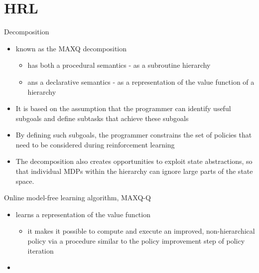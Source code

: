 
\section{HRL}

\begin{frame}{Decomposition}
\begin{itemize}
    \item known as the MAXQ decomposition
    \begin{itemize}
        \item has both a procedural semantics -  as a subroutine hierarchy
        \item ans a declarative semantics - as a representation of the value function of a hierarchy
    \end{itemize}
    \item It is based on the assumption that the programmer can identify useful subgoals and define subtasks that achieve these subgoals
    \item By defining such subgoals, the programmer \alert{constrains the set of policies} that need to be considered during reinforcement learning
    \item {\color{red}The decomposition also creates opportunities to exploit state abstractions, so that individual MDPs within the hierarchy can ignore large parts of the state space.}
    \end{itemize}
\end{frame}

\begin{frame}{Online model-free learning algorithm, MAXQ-Q}
    \begin{itemize}
        \item learns a representation of the value function
        \begin{itemize}
            \item \alert{it makes it possible to compute and execute an improved, non-hierarchical policy via a procedure similar to the policy improvement step of policy iteration}
        \end{itemize}
        \item 
    \end{itemize}
\end{frame}

